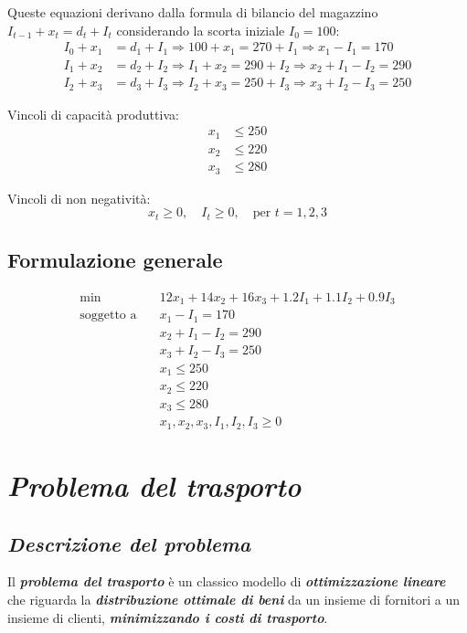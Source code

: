 Queste equazioni derivano dalla formula di bilancio del magazzino $I_{t-1}+x_t=d_t+I_t$
considerando la scorta iniziale $I_0 = 100$:
\begin{align*}
I_0 + x_1 &= d_1 + I_1 \Rightarrow 100 + x_1 = 270 + I_1 \Rightarrow x_1 - I_1 = 170 \\
I_1 + x_2 &= d_2 + I_2 \Rightarrow I_1 + x_2 = 290 + I_2 \Rightarrow x_2 + I_1 - I_2 = 290 \\
I_2 + x_3 &= d_3 + I_3 \Rightarrow I_2 + x_3 = 250 + I_3 \Rightarrow x_3 + I_2 - I_3 = 250
\end{align*}

Vincoli di capacità produttiva:
\[ 
\begin{aligned}
x_1 &\leq 250 \\
x_2 &\leq 220 \\
x_3 &\leq 280
\end{aligned}
\]

Vincoli di non negatività:
\[ 
x_t \geq 0, \quad I_t \geq 0, \quad \text{per } t = 1, 2, 3
\]

\subsection{Formulazione generale}
\[ 
\begin{aligned}
\min \quad & 12x_1 + 14x_2 + 16x_3 + 1.2I_1 + 1.1I_2 + 0.9I_3 \\
\text{soggetto a} \quad 
& x_1 - I_1 = 170 \\
& x_2 + I_1 - I_2 = 290 \\
& x_3 + I_2 - I_3 = 250 \\
& x_1 \leq 250 \\
& x_2 \leq 220 \\
& x_3 \leq 280 \\
& x_1, x_2, x_3, I_1, I_2, I_3 \geq 0
\end{aligned}
\]

\section{\textbf{\textit{Problema del trasporto}}}
\subsection{\textbf{\textit{Descrizione del problema}}}
Il \textbf{\textit{problema del trasporto}} è un classico modello di \textbf{\textit{ottimizzazione lineare}} 
che riguarda la \textbf{\textit{distribuzione ottimale di beni}} da un insieme di fornitori 
a un insieme di clienti, \textbf{\textit{minimizzando i costi di trasporto}}.

